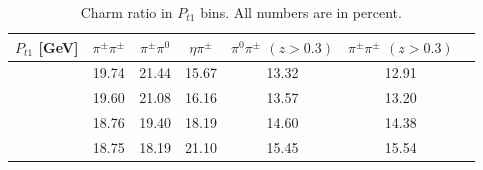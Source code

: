 \begin{table}[H]\footnotesize
\centering
\begin{tabular}{|c||c|c|c|c|c|c|}
\hline
$P_{t1}$ [GeV]  &$\pi^{\pm}\pi^{\pm}$ & $\pi^{\pm}\pi^0$ & $\eta\pi^{\pm}$ & $\pi^0\pi^{\pm}$ $(z>0.3)$ & $\pi^{\pm}\pi^{\pm}$ $(z>0.3)$ \\ \hline\hline
[0,0.15]	&	19.74	&	21.44	&	15.67	&	13.32	&	12.91	\\ \hline
[0.15,0.30]	&	19.60	&	21.08	&	16.16	&	13.57	&	13.20	\\ \hline
[0.30,0.50]	&	18.76	&	19.40	&	18.19	&	14.60	&	14.38	\\ \hline
[0.50,3.0]	&	18.75	&	18.19	&	21.10	&	15.45	&	15.54	\\ \hline
\end{tabular}
\caption[Charm ratio in $P_{t1}$ bins]{Charm ratio in $P_{t1}$ bins. All numbers are in percent.}
\label{tab:sinptcharmratio}
\end{table}

